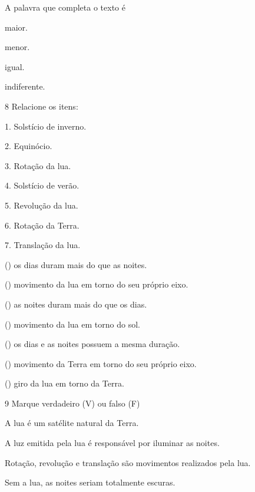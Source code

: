 A palavra que completa o texto é

\begin{escolha}
\item maior.

\item menor.

\item igual.

\item indiferente.
\end{escolha}


\num{8} Relacione os itens:

\begin{multicols}{1}
1. Solstício de inverno.

2. Equinócio.

3. Rotação da lua.

4. Solstício de verão.

5. Revolução da lua.

6. Rotação da Terra.

7. Translação da lua.

\columnbreak

() os dias duram mais do que as noites.

() movimento da lua em torno do seu próprio eixo.

() as noites duram mais do que os dias.

() movimento da lua em torno do sol.

() os dias e as noites possuem a mesma duração.

() movimento da Terra em torno do seu próprio eixo.

() giro da lua em torno da Terra.
\end{multicols}


\num{9} Marque verdadeiro (V) ou falso (F)

\begin{boxlist}
\item A lua é um satélite natural da Terra. 

\item A luz emitida pela lua é responsável por iluminar as noites. 

\item Rotação, revolução e translação são movimentos realizados pela lua. 

\item Sem a lua, as noites seriam totalmente escuras. 
\end{boxlist}


